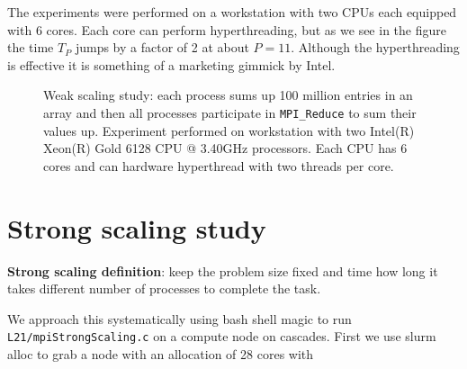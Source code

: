 The experiments were performed on a workstation with two CPUs each equipped with 6 cores. Each core can perform hyperthreading, but as we see in the figure the time $T_P$ jumps by a factor of 2 at about $P=11$. Although the hyperthreading is effective it is something of a marketing gimmick by Intel.

\begin{figure}[htbp!]
\begin{center}
\end{center}
\caption{Weak scaling study: each process sums up 100 million entries in an array and then all processes participate in \texttt{MPI\_Reduce} to sum their values up. Experiment performed on workstation with two   Intel(R) Xeon(R) Gold 6128 CPU @ 3.40GHz processors. Each CPU has 6 cores and can hardware hyperthread with two threads per core.
 }
\label{reductionWeakScalingStudy100.fig}
\end{figure}

\section{Strong scaling study}

{\bf Strong scaling definition}: keep the problem size fixed and time how long it takes different number of processes to complete the task.


We approach this systematically using bash shell magic to run \texttt{L21/mpiStrongScaling.c} on a compute node on cascades. First we use slurm alloc to grab a node with an allocation of 28 cores with

